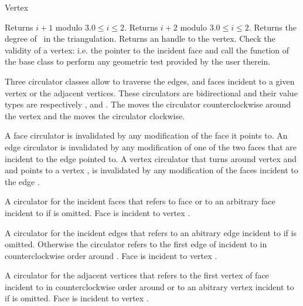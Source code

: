 \begin{ccClass}{Vertex}

{Returns $i+1$ modulo 3.\ccPrecond $0\leq i \leq 2$.}
\ccGlue
{}
{Returns $i+2$ modulo 3.\ccPrecond $0\leq i \leq 2$.}
\ccGlue
{}
{Returns the degree of \ccVar\ in the triangulation.}
\ccGlue
{}
{Returns an handle to the vertex.}
\ccGlue
{} 
{Check the validity of a vertex:
i.e. the pointer to the incident face  and call the 
function of the base class to perform any geometric test provided by the user
therein.}



Three circulator classes allow to traverse the edges, and faces
incident to a given vertex or  the adjacent vertices.
 These circulators are bidirectional
and their value types are respectively , 
and .
The   moves the circulator
counterclockwise around the vertex 
and  the  moves the circulator
clockwise. 

A face circulator is invalidated by any modification of the face it
points to. An edge circulator is invalidated
by any modification of one of the two faces that are incident to the edge
pointed to.  A vertex circulator that turns around vertex 
and and points  to a vertex , is invalidated
by any modification of the faces incident to the edge .




{A circulator for the  incident faces 
that refers to face  or to an arbitrary face
incident to   if  is omitted.
\ccPrecond Face  is incident to vertex .}

{A circulator for the incident edges that refers to an abitrary edge incident
to  if  is omitted. Otherwise the circulator refers
to the first edge of 
incident
to  in counterclockwise order around .
\ccPrecond Face  is incident to vertex . }

{A circulator for the adjacent vertices that refers to the first vertex of face 
incident to  in counterclockwise order around  or to
an abitrary vertex incident
to  if   is omitted.
\ccPrecond Face  is incident to vertex .}


\end{ccClass} 

